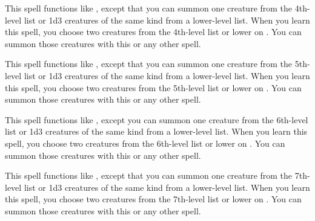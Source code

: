 \begin{spelleffect}
    This spell functions like , except that you can summon one creature from the 4th-level list or 1d3 creatures of the same kind from a lower-level list. When you learn this spell, you choose two creatures from the 4th-level list or lower on . You can summon those creatures with this or any other  spell.
\end{spelleffect}

\begin{spelleffect}
    This spell functions like , except that you can summon one creature from the 5th-level list or 1d3 creatures of the same kind from a lower-level list. When you learn this spell, you choose two creatures from the 5th-level list or lower on . You can summon those creatures with this or any other  spell.
\end{spelleffect}

\begin{spelleffect}
    This spell functions like , except you can summon one creature from the 6th-level list or 1d3 creatures of the same kind from a lower-level list. When you learn this spell, you choose two creatures from the 6th-level list or lower on . You can summon those creatures with this or any other  spell.
\end{spelleffect}

\begin{spelleffect}
    This spell functions like , except that you can summon one creature from the 7th-level list or 1d3 creatures of the same kind from a lower-level list. When you learn this spell, you choose two creatures from the 7th-level list or lower on . You can summon those creatures with this or any other  spell.
\end{spelleffect}

